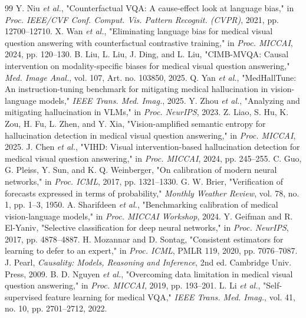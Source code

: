 \documentclass[journal,twoside,web]{ieeecolor}
\begin{document}
\begin{thebibliography}{99}
 Y. Niu \textit{et al.}, "Counterfactual VQA: A cause-effect look at language bias," in \textit{Proc. IEEE/CVF Conf. Comput. Vis. Pattern Recognit. (CVPR)}, 2021, pp. 12700--12710.
 X. Wan \textit{et al.}, "Eliminating language bias for medical visual question answering with counterfactual contrastive training," in \textit{Proc. MICCAI}, 2024, pp. 120--130.
 B. Liu, L. Liu, J. Ding, and L. Liu, "CIMB-MVQA: Causal intervention on modality-specific biases for medical visual question answering," \textit{Med. Image Anal.}, vol. 107, Art. no. 103850, 2025.
 Q. Yan \textit{et al.}, "MedHallTune: An instruction-tuning benchmark for mitigating medical hallucination in vision-language models," \textit{IEEE Trans. Med. Imag.}, 2025.
 Y. Zhou \textit{et al.}, "Analyzing and mitigating hallucination in VLMs," in \textit{Proc. NeurIPS}, 2023.
 Z. Liao, S. Hu, K. Zou, H. Fu, L. Zhen, and Y. Xia, "Vision-amplified semantic entropy for hallucination detection in medical visual question answering," in \textit{Proc. MICCAI}, 2025.
 J. Chen \textit{et al.}, "VIHD: Visual intervention-based hallucination detection for medical visual question answering," in \textit{Proc. MICCAI}, 2024, pp. 245--255.
 C. Guo, G. Pleiss, Y. Sun, and K. Q. Weinberger, "On calibration of modern neural networks," in \textit{Proc. ICML}, 2017, pp. 1321--1330.
 G. W. Brier, "Verification of forecasts expressed in terms of probability," \textit{Monthly Weather Review}, vol. 78, no. 1, pp. 1--3, 1950.
 A. Sharifdeen \textit{et al.}, "Benchmarking calibration of medical vision-language models," in \textit{Proc. MICCAI Workshop}, 2024.
 Y. Geifman and R. El-Yaniv, "Selective classification for deep neural networks," in \textit{Proc. NeurIPS}, 2017, pp. 4878--4887.
 H. Mozannar and D. Sontag, "Consistent estimators for learning to defer to an expert," in \textit{Proc. ICML}, PMLR 119, 2020, pp. 7076--7087.
 J. Pearl, \textit{Causality: Models, Reasoning and Inference}, 2nd ed. Cambridge Univ. Press, 2009.
 B. D. Nguyen \textit{et al.}, "Overcoming data limitation in medical visual question answering," in \textit{Proc. MICCAI}, 2019, pp. 193--201.
 L. Li \textit{et al.}, "Self-supervised feature learning for medical VQA," \textit{IEEE Trans. Med. Imag.}, vol. 41, no. 10, pp. 2701--2712, 2022.

\end{thebibliography}
\end{document}
